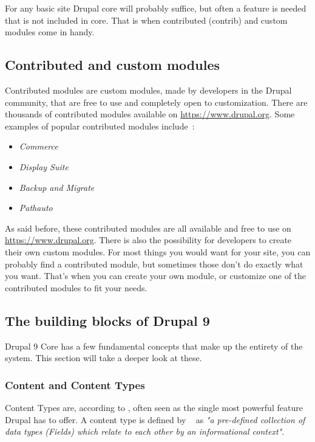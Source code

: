 For any basic site Drupal core will probably suffice, but often a feature is needed that is not included in core. That is when contributed (contrib) and custom modules come in handy.


\subsection{Contributed and custom modules}

Contributed modules are custom modules, made by developers in the Drupal community, that are free to use and completely open to customization. There are thousands of contributed modules available on \url{https://www.drupal.org}. Some examples of popular contributed modules include~\autocite{Tomlinson2015}: 

\begin{itemize}
	\item  \emph{Commerce}
	\item  \emph{Display Suite}
	\item  \emph{Backup and Migrate}
	\item  \emph{Pathauto}
\end{itemize}

As said before, these contributed modules are all available and free to use on \url{https://www.drupal.org}. There is also the possibility for developers to create their own custom modules. For most things you would want for your site, you can probably find a contributed module, but sometimes those don't do exactly what you want. That's when you can create your own module, or customize one of the contributed modules to fit your needs.


\subsection{The building blocks of Drupal 9}

Drupal 9 Core has a few fundamental concepts that make up the entirety of the system. This section will take a deeper look at these.

\subsubsection{Content and Content Types}

Content Types are, according to \textcite{Tomlinson2015}, often seen as the single most powerful feature Drupal has to offer. A content type is defined by ~\textcite{Drupal2021} as \emph{"a pre-defined collection of data types (Fields) which relate to each other by an informational context"}. 

